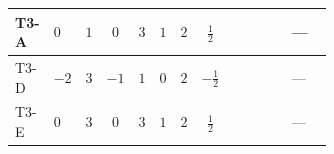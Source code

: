 \documentclass[8pt]{article}
\begin{document}
\begin{landscape}
\begin{longtable}{@{}llcccccc >{\raggedright\arraybackslash}p{0.21\linewidth} >{\raggedright\arraybackslash}p{0.21\linewidth} >{\raggedright\arraybackslash}p{0.21\linewidth}@{}}
\midrule
T3-A & $0$ & $1$ & $0$ & $3$ & $1$ & $2$ & $\frac{1}{2}$ & \scriptsize\adjustbox{max width=\linewidth}{$\begin{gathered} +12 {\lambda_H}^2\end{gathered}$} & \scriptsize\adjustbox{max width=\linewidth}{$\begin{gathered} +2 {\lambda_{H1}}^2\end{gathered}$} & --- \\
\midrule
T3-D & $-2$ & $3$ & $-1$ & $1$ & $0$ & $2$ & $-\frac{1}{2}$ & \scriptsize\adjustbox{max width=\linewidth}{$\begin{gathered} +12 {\lambda_H}^2\end{gathered}$} & \scriptsize\adjustbox{max width=\linewidth}{$\begin{gathered} +6 {\lambda_{H1}}^2\end{gathered}$} & --- \\
\midrule
T3-E & $0$ & $3$ & $0$ & $3$ & $1$ & $2$ & $\frac{1}{2}$ & \scriptsize\adjustbox{max width=\linewidth}{$\begin{gathered} +12 {\lambda_H}^2\end{gathered}$} & \scriptsize\adjustbox{max width=\linewidth}{$\begin{gathered} +6 {\lambda_{H1}}^2\end{gathered}$} & --- \\
\midrule
\bottomrule
\end{longtable}
\clearpage

\end{landscape}
\end{document}
